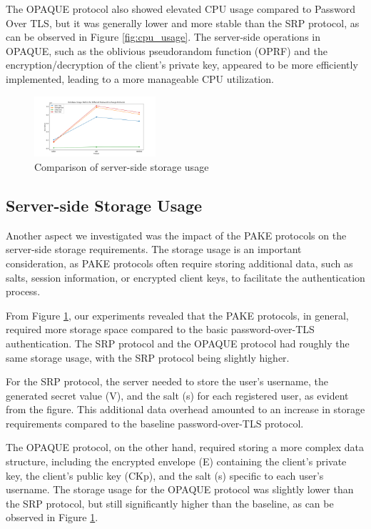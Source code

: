 The OPAQUE protocol also showed elevated CPU usage compared to Password Over TLS, but it was generally lower and more stable than the SRP protocol, as can be observed in Figure \ref{fig:cpu_usage}. The server-side operations in OPAQUE, such as the oblivious pseudorandom function (OPRF) and the encryption/decryption of the client's private key, appeared to be more efficiently implemented, leading to a more manageable CPU utilization.

\begin{figure}[ht]
  \centering
  \includegraphics[width=0.4\textwidth]{./images/database_usage_metrics_line.png}
  \caption{Comparison of server-side storage usage}
  \label{fig:storage_usage}
\end{figure}

\subsection{Server-side Storage Usage}

Another aspect we investigated was the impact of the PAKE protocols on the server-side storage requirements. The storage usage is an important consideration, as PAKE protocols often require storing additional data, such as salts, session information, or encrypted client keys, to facilitate the authentication process.

From Figure \ref{fig:storage_usage}, our experiments revealed that the PAKE protocols, in general, required more storage space compared to the basic password-over-TLS authentication. The SRP protocol and the OPAQUE protocol had roughly the same storage usage, with the SRP protocol being slightly higher.

For the SRP protocol, the server needed to store the user's username, the generated secret value (V), and the salt (s) for each registered user, as evident from the figure. This additional data overhead amounted to an increase in storage requirements compared to the baseline password-over-TLS protocol.

The OPAQUE protocol, on the other hand, required storing a more complex data structure, including the encrypted envelope (E) containing the client's private key, the client's public key (CKp), and the salt (s) specific to each user's username. The storage usage for the OPAQUE protocol was slightly lower than the SRP protocol, but still significantly higher than the baseline, as can be observed in Figure \ref{fig:storage_usage}.

